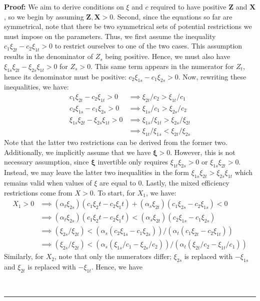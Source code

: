 \documentclass[11pt,a4paper,leqno]{extarticle}
\newenvironment{proof}[1][Proof]{\noindent\textbf{#1:} }{\ \rule{0.5em}{0.5em}}
\begin{document}
	\begin{proof}
		We aim to derive conditions on $\xi$ and $c$ required to have positive $\mathbf{Z}$ and $\mathbf{X}$, so we begin by assuming $\mathbf{Z}, \mathbf{X} > 0$. Second, since the equations so far are symmetrical, note that there be two symmetrical sets of potential restrictions we must impose on the parameters. Thus, we first assume the inequality $c_1 \xi_{2t} - c_2 \xi_{1t} > 0$ to restrict ourselves to one of the two cases. This assumption results in the denominator of $Z_s$ being positive. Hence, we must also have $\xi_{1s}\xi_{2t} - \xi_{2s}\xi_{1t} > 0 $ for $Z_s > 0$. This same term appears in the numerator for $Z_t$, hence its denominator must be positive: $c_2 \xi_{1s} - c_1 \xi_{2s} > 0$. Now, rewriting these inequalities, we have:
		\begin{align*}
		c_1 \xi_{2t} - c_2 \xi_{1t} > 0 &\implies \xi_{2t}/c_2 > \xi_{1t}/c_1 \\
		c_2 \xi_{1s} - c_1 \xi_{2s} > 0 &\implies \xi_{1s}/c_1 > \xi_{2s}/c_2 \\
		\xi_{1s}\xi_{2t} - \xi_{2s}\xi_{1t} > 0 &\implies \xi_{1s}/\xi_{1t} > \xi_{2s}/\xi_{2t} \\
		&\implies \xi_{1t}/\xi_{1s} < \xi_{2t}/\xi_{2s} 
		\end{align*}
		Note that the latter two restrictions can be derived from the former two. Additionally, we implicitly assume that we have $\boldsymbol{\xi} > 0$. However, this is not necessary assumption, since $\boldsymbol{\xi}$ invertible only requires $\xi_{1t} \xi_{2s} > 0$ or $\xi_{1s} \xi_{2t} > 0$. Instead, we may leave the latter two inequalities in the form $ \xi_{1s}\xi_{2t} > \xi_{2s}\xi_{1t}$ which remains valid when values of $\xi$ are equal to $0$. Lastly, the mixed efficiency restrictions come from $X > 0$. To start, for $X_1$, we have:
		\begin{align*}
		X_1 > 0 &\implies (\alpha_t \xi_{2s})(c_1 \xi_2t - c_2\xi_1t) + (\alpha_s \xi_{2t})(c_1 \xi_{2s} - c_2 \xi_{1s}) < 0\\
		&\implies (\alpha_t \xi_{2s})(c_1 \xi_2t - c_2\xi_1t) < (\alpha_s \xi_{2t})(c_2 \xi_{1s} - c_1 \xi_{2s}) \\
		&\implies (\xi_{2s}/\xi_{2t}) < (\alpha_s (c_2 \xi_{1s} - c_1 \xi_{2s}))/(\alpha_t(c_1 \xi_{2t} - c_2\xi_{1t})) \\
		&\implies (\xi_{2s}/\xi_{2t}) < (\alpha_s (\xi_{1s}/c_1 -  \xi_{2s}/c_2))/(\alpha_t(\xi_{2t}/c_2 - \xi_{1t}/c_1)) 
		\end{align*}
		Similarly, for $X_2$, note that only the numerators differ; $\xi_{2s}$ is replaced with $-\xi_{1s}$ and $\xi_{2t}$ is replaced with $-\xi_{1t}$. Hence, we have

\end{proof}
\end{document}
